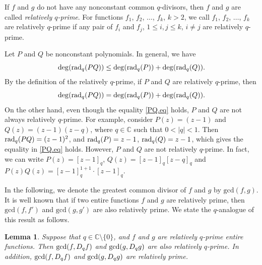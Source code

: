 \documentclass[a4paper,12pt]{article}
\newcommand{\C}{\mathbb{C}}
\newtheorem{lemma}[defin]{Lemma}
\numberwithin{equation}{section}
\begin{document}
 If $f$ and $g$ do not have any nonconstant common $q$-divisors, then $f$ and $g$ are called \emph{relatively $q$-prime}.
For functions $f_1$, $f_2$, $\dots$, $f_k$, $k>2$, we call $f_1$, $f_2$, $\dots$, $f_k$ are relatively $q$-prime if any pair of $f_i$ and $f_j$, $1\leq i, j\leq k$, $i\ne j$ are relatively $q$-prime.

Let $P$ and $Q$ be nonconstant polynomials. In general, we have
$$
\deg({\rm rad}_q (PQ))\leq
\deg({\rm rad}_q (P))+\deg({\rm rad}_q (Q)).
$$
 By the definition of the relatively $q$-prime, if $P$ and $Q$ are relatively $q$-prime, then
    \begin{equation}\label{PQ.eq}
    \deg({\rm rad}_q (PQ))=\deg({\rm rad}_q (P))+\deg({\rm rad}_q (Q)).
    \end{equation}
On the other hand, even though the equality \eqref{PQ.eq} holds, $P$ and $Q$ are not always relatively $q$-prime. For example, consider $P(z)=(z-1)$ and $Q(z)=(z-1)(z-q)$, where $q\in\C$ such that $0<|q|<1$. Then ${\rm rad}_q (PQ)=(z-1)^2$, and ${\rm rad}_q (P)=z-1$, ${\rm rad}_q (Q)=z-1$, which gives the equality in \eqref{PQ.eq} holds. However, $P$ and $Q$ are not relatively $q$-prime. In fact, we can write $P(z)=[z-1]_q$, $Q(z)=[z-1]_q[z-q]_q$ and $P(z)Q(z)=[z-1]_q^{1+1}\cdot[z-1]_q$.

In the following, we denote the greatest common divisor of $f$ and $g$ by $\text{gcd}(f,g)$.
It is well known that if two entire functions $f$ and $g$ are relatively prime, then $\text{gcd}(f,f')$ and $\text{gcd}(g,g')$ are also relatively prime. We state the $q$-analogue of this result as follows.

\begin{lemma}\label{q-prime}
Suppose that $q\in\C\setminus\{0\}$, and $f$ and $g$ are relatively $q$-prime entire functions. Then ${\rm gcd}(f,D_q f)$
and ${\rm gcd}(g,D_q g)$ are also relatively $q$-prime. In addition, ${\rm gcd}(f,D_q f)$
and ${\rm gcd}(g,D_q g)$ are relatively prime.
\end{lemma}
\end{document}
